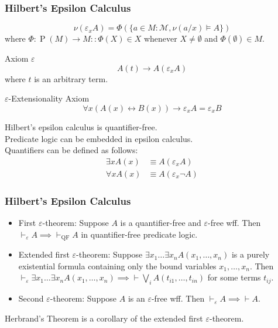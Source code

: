 \documentclass[UTF8,11pt,colorlinks,compress,openany]{beamer}%
\begin{document}
\begin{frame}\frametitle{Hilbert's Epsilon Calculus}
\[\nu(\varepsilon_x A)=\Phi\left(\{a\in M:\mathcal{M},\nu(a/x)\vDash A\}\right)\]
where $\Phi:\operatorname{P}(M)\to M :: \Phi(X)\in X$ whenever $X\ne\emptyset$ and $\Phi(\emptyset)\in M$.
\begin{block}{Axiom $\varepsilon$}
\[A(t)\to A(\varepsilon_xA)\]
where $t$ is an arbitrary term.
\end{block}
\begin{block}{$\varepsilon$-Extensionality Axiom}
\[\forall x(A(x)\leftrightarrow B(x))\to \varepsilon_xA=\varepsilon_x B\]
\end{block}
Hilbert's epsilon calculus is quantifier-free.\\Predicate logic can be embedded in epsilon calculus.\\
Quantifiers can be defined as follows:
\begin{align*}
\exists x A(x)&\equiv A(\varepsilon_x A)\\
\forall x A(x)&\equiv A(\varepsilon_x\neg A)
\end{align*}
\end{frame}

\begin{frame}\frametitle{Hilbert's Epsilon Calculus}
\begin{itemize}
	\item First $\varepsilon$-theorem: Suppose $A$ is a quantifier-free and $\varepsilon$-free wff. Then $\vdash_\varepsilon A\implies\vdash_{\mathrm{QF}} A$ in quantifier-free predicate logic.
	\item Extended first $\varepsilon$-theorem: Suppose $\exists x_1\dots\exists x_n A(x_1,\dots,x_n)$ is a purely existential formula containing only the bound variables $x_1,\dots,x_n$. Then $\vdash_\varepsilon\exists x_1\dots\exists x_n A(x_1,\dots,x_n)\implies\vdash\bigvee\limits_i A(t_{i1},\dots,t_{in})$ for some terms $t_{ij}$.
	\item Second $\varepsilon$-theorem: Suppose $A$ is an $\varepsilon$-free wff. Then $\vdash_\varepsilon A\implies \vdash A$.
\end{itemize}
Herbrand's Theorem is a corollary of the extended first $\varepsilon$-theorem.
\end{frame}
\end{document}
